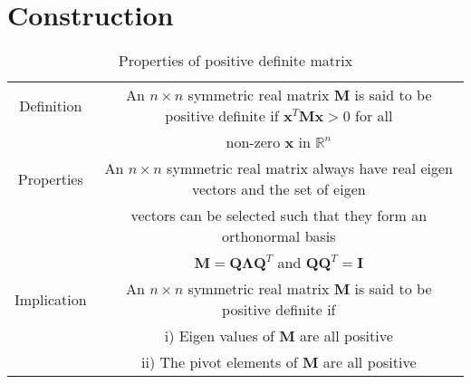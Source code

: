 \documentclass[journal,12pt,twocolumn]{IEEEtran}
\numberwithin{equation}{subsection}
\let\vec\mathbf
\newcommand\myemptypage{
	\null
	\thispagestyle{empty}
	\addtocounter{page}{-1}
	\newpage
}
\begin{document}
\section{Construction}
\begin{table}[hp]
    \centering
    \begin{tabular}{|c|c|}
        \hline
        Definition  & An $n \times n$ symmetric real matrix $\vec{M}$ is said to be positive definite if $\vec{x}^T\vec{M}\vec{x}>0$ for all\\
        &non-zero $\vec{x}$ in $\mathbb{R}^n$ \\
        \hline
        Properties & An $n \times n$ symmetric real matrix always have real eigen vectors and the set of eigen \\& vectors can be selected such that they form an orthonormal basis\\
        & $\vec{M}=\vec{Q}\vec{\Lambda}\vec{Q}^T$ and $\vec{Q}\vec{Q}^T=\vec{I}$\\
        \hline
        Implication & An $n \times n$ symmetric real matrix $\vec{M}$ is said to be positive definite if\\
        & \qquad i) \quad Eigen values of $\vec{M}$ are all positive\\
        & \qquad ii) \quad The pivot elements of $\vec{M}$ are all positive\\
        \hline
    \end{tabular}
    \caption{Properties of positive definite matrix}
    \label{tab:my_label}
\end{table}
\pagebreak
\myemptypage
\end{document}
